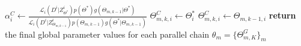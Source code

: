 \documentclass[6pt,a4]{article}
\begin{document}
\begin{algorithm}
\begin{algorithmic}[1]
           
            \State $\alpha_i^C \gets \frac{\mathcal{L}_i(D^i|Z^i_{\Theta^*}) p(\Theta^*) g(\Theta_{m,k-1}|\Theta^*)}{\mathcal{L}_i(D^i|Z^i_{\Theta_{m,k-1}}) p(\Theta_{m,k-1}) g(\Theta^*|\Theta_{m,k-1})}$ 
             
              \State $\Theta_{m,k,i}^C \gets \Theta^*_{i}$ 
            \Else {}
              \State $\Theta_{m,k,i}^C \gets \Theta_{m,k-1,i}$ 
            \EndIf
          \EndFor
      \EndIf
  \EndFor 
\EndFor
\State \textbf{return} the final global parameter values for each parallel chain $\theta_m = \{\Theta^G_{m,K}\}_m$
\end{algorithmic}
\end{algorithm}
\end{document}
